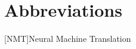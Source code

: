 
\pagestyle{plain}


\chapter*{Abbreviations}

\begin{acronym}
    [NMT]{Neural Machine Translation}
\end{acronym}

\vspace*{15mm}
\cleardoublepage
